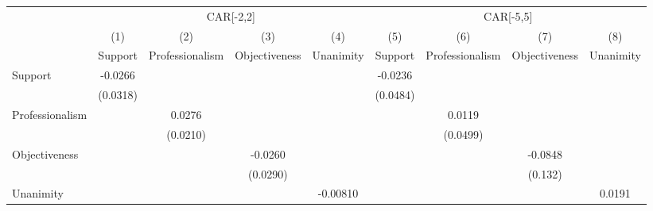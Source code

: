 {
\def\sym#1{\ifmmode^{#1}\else\(^{#1}\)\fi}
\begin{tabular}{l*{8}{c}}
\hline\hline
                    &\multicolumn{4}{c}{CAR[-2,2]}                                                          &\multicolumn{4}{c}{CAR[-5,5]}                                                          \\
                    &\multicolumn{1}{c}{(1)}&\multicolumn{1}{c}{(2)}&\multicolumn{1}{c}{(3)}&\multicolumn{1}{c}{(4)}&\multicolumn{1}{c}{(5)}&\multicolumn{1}{c}{(6)}&\multicolumn{1}{c}{(7)}&\multicolumn{1}{c}{(8)}\\
                    &\multicolumn{1}{c}{Support}&\multicolumn{1}{c}{Professionalism}&\multicolumn{1}{c}{Objectiveness}&\multicolumn{1}{c}{Unanimity}&\multicolumn{1}{c}{Support}&\multicolumn{1}{c}{Professionalism}&\multicolumn{1}{c}{Objectiveness}&\multicolumn{1}{c}{Unanimity}\\
\hline
Support             &     -0.0266         &                     &                     &                     &     -0.0236         &                     &                     &                     \\
                    &    (0.0318)         &                     &                     &                     &    (0.0484)         &                     &                     &                     \\
Professionalism     &                     &      0.0276         &                     &                     &                     &      0.0119         &                     &                     \\
                    &                     &    (0.0210)         &                     &                     &                     &    (0.0499)         &                     &                     \\
Objectiveness       &                     &                     &     -0.0260         &                     &                     &                     &     -0.0848         &                     \\
                    &                     &                     &    (0.0290)         &                     &                     &                     &     (0.132)         &                     \\
Unanimity           &                     &                     &                     &    -0.00810         &                     &                     &                     &      0.0191         \\

\end{tabular}}
